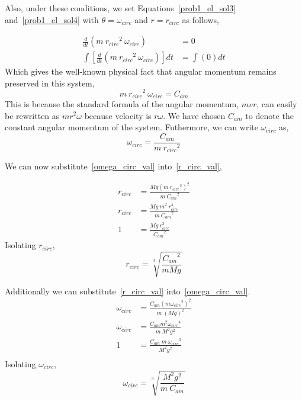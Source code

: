 \documentclass[conference]{IEEEtran}
\begin{document}
Also, under these conditions, we set Equations~\ref{prob1_el_sol3} and~\ref{prob1_el_sol4}
with $\dot{\theta} = \omega_{circ}$ and $r = r_{circ}$ as follows,

\begin{align*}
    \frac{d}{dt}\left( m~{r_{circ}}^2~\omega_{circ} \right) &= 0\\
    \int \left[ \frac{d}{dt}\left( m~{r_{circ}}^2~\omega_{circ} \right) \right] dt &= \int (0) dt
\end{align*}
Which gives the well-known physical fact that angular momentum remains preserved in this system,
\begin{equation}
    m~{r_{circ}}^2~\omega_{circ} = C_{am}
\end{equation}
This is because the standard formula of the angular momentum, $mvr$, can
easily be rewritten as $mr^2\omega$ because velocity is $r\omega$. We have
chosen $C_{am}$ to denote the constant angular momentum of the system.
Futhermore, we can write $\omega_{circ}$ as,
\begin{equation}\label{omega_circ_val}
    \omega_{circ} = \frac{C_{am}}{m~{r_{circ}}^2}
\end{equation}

We can now substitute~\ref{omega_circ_val} into~\ref{r_circ_val},

\begin{align*}
    r_{circ} &= \frac{Mg(m~{r_{circ}}^2)^2}{m~{C_{am}}^2}\\
    r_{circ} &= \frac{Mg~m^2~r_{circ}^4}{m~{C_{am}}^2}\\
    1 &= \frac{Mg~r_{circ}^3}{{C_{am}}^2}
\end{align*}
Isolating $r_{circ}$,
\begin{equation}\label{prob1_obj4_r}
    r_{circ} = \sqrt[3]{\frac{{C_{am}}^2}{mMg}}
\end{equation}

Additionally we can substitute~\ref{r_circ_val} into~\ref{omega_circ_val}.
\begin{align*}
    \omega_{circ} &= \frac{C_{am}(m{\omega_{circ}}^2)^2}{m~{(Mg)}^2}\\
    \omega_{circ} &= \frac{C_{am}m^2{\omega_{circ}}^4}{m~M^2g^2}\\
    1 &= \frac{C_{am}~m~{\omega_{circ}}^3}{M^2g^2}\\
\end{align*}
Isolating $\omega_{circ}$,
\begin{equation}\label{prob4_obj4_omega}
    \omega_{circ} = \sqrt[3]{\frac{M^2g^2}{m~C_{am}}}
\end{equation}
\end{document}
